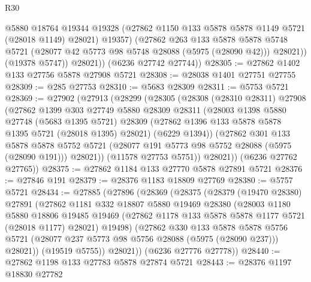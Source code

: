 \begin{lexlean}{R30}
\begin{coremodule}
                @5880
                @18764
                @19344
                @19328
                (@27862 @1150 @133 @5878 @5878 @1149 @5721 (@28018 @1149) @28021)
                @19357)
              (@27862
                @263
                @133
                @5878
                @5878
                @5748
                @5721
                (@28077 @42 @5773 @98 @5748 @28088 (@5975 (@28090 @42)))
                @28021))
            (@19378 @5747))
          @28021))
      (@6236 @27742 @27744))
@28305 := @27862 @1402 @133 @27756 @5878 @27908 @5721
@28308 := @28038 @1401 @27751 @27755
@28309 := @285 @27753
@28310 := @5683 @28309
@28311 := @5753 @5721
@28369 := @27902
    (@27913
      (@28299
        (@28305
          (@28308
            (@28310 @28311)
            @27908
            (@27862
              @1399
              @303
              @27749
              @5880
              @28309
              @28311
              (@28003
                @1398
                @5880
                @27748
                (@5683 @1395 @5721)
                @28309
                (@27862 @1396 @133 @5878 @5878 @1395 @5721 (@28018 @1395) @28021)
                (@6229 @1394))
              (@27862
                @301
                @133
                @5878
                @5878
                @5752
                @5721
                (@28077 @191 @5773 @98 @5752 @28088 (@5975 (@28090 @191)))
                @28021))
            (@11578 @27753 @5751))
          @28021))
      (@6236 @27762 @27765))
@28375 := @27862 @1184 @133 @27770 @5878 @27891 @5721
@28376 := @27846 @191
@28379 := @28376 @1183 @18809 @27769
@28380 := @5757 @5721
@28434 := @27885
    (@27896
      (@28369
        (@28375
          (@28379
            (@19470 @28380)
            @27891
            (@27862
              @1181
              @332
              @18807
              @5880
              @19469
              @28380
              (@28003
                @1180
                @5880
                @18806
                @19485
                @19469
                (@27862 @1178 @133 @5878 @5878 @1177 @5721 (@28018 @1177) @28021)
                @19498)
              (@27862
                @330
                @133
                @5878
                @5878
                @5756
                @5721
                (@28077 @237 @5773 @98 @5756 @28088 (@5975 (@28090 @237)))
                @28021))
            (@19519 @5755))
          @28021))
      (@6236 @27776 @27778))
@28440 := @27862 @1198 @133 @27783 @5878 @27874 @5721
@28443 := @28376 @1197 @18830 @27782

\end{coremodule}
\end{lexlean}
